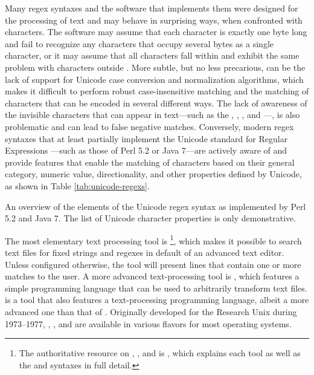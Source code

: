 Many regex syntaxes and the software that implements them were designed for the
processing of  text and may behave in surprising ways, when
confronted with  characters. The software may assume that each
character is exactly one byte long and fail to recognize any characters that
occupy several bytes as a single character, or it may assume that all
 characters fall within  and exhibit the same problem
with characters outside . More subtle, but no less precarious, can
be the lack of support for Unicode case conversion and normalization algorithms,
which makes it difficult to perform robust case-insensitive matching and the
matching of characters that can be encoded in several different ways. The lack
of awareness of the invisible characters that can appear in 
text---such as the , , , and ---, is also problematic and can lead to false negative matches.
Conversely, modern regex syntaxes that at least partially implement the Unicode
standard for Regular Expressions \cite{unicode13}---such as those of Perl 5.2 or
Java 7---are actively aware of  and provide features that enable
the matching of characters based on their general category, numeric value,
directionality, and other properties defined by Unicode, as shown in Table
\ref{tab:unicode-regexs}.

\begin{table}[!tb]
  
  \caption{An overview of the elements of the Unicode regex syntax as
    implemented by Perl 5.2 and Java 7. The list of Unicode character properties
    is only demonstrative.}
  \label{tab:unicode-regexs}
\end{table}

The most elementary text processing  tool is %
\footnote{
  The authoritative resource on , , and 
  is , which explains each tool as well as the
   and  syntaxes in full detail.
}, which makes it possible to search text files for fixed strings and regexes in
default of an advanced text editor. Unless configured otherwise, the tool will
present lines that contain one or more matches to the user. A more advanced
text-processing  tool is , which features a simple
programming language that can be used to arbitrarily transform text files.
 is a  tool that also features a text-processing
programming language, albeit a more advanced one than that of .
Originally developed for the Research Unix during 1973--1977, ,
, and  are available in various flavors for most
operating systems.

